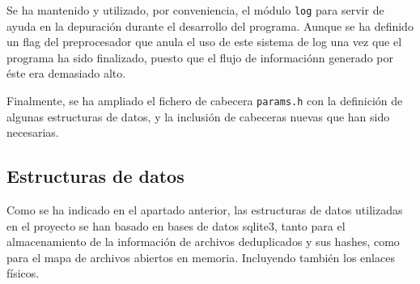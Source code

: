 \documentclass[12pt,a4paper]{article}
\begin{document}
Se ha mantenido y utilizado, por conveniencia, el módulo \texttt{\small log} para servir de ayuda en la depuración durante el desarrollo del programa. Aunque se ha definido un flag del preprocesador que anula el uso de este sistema de log una vez que el programa ha sido finalizado, puesto que el flujo de informaciónn generado por éste era demasiado alto.

Finalmente, se ha ampliado el fichero de cabecera \texttt{\small params.h} con la definición de algunas estructuras de datos, y la inclusión de cabeceras nuevas que han sido necesarias.

\subsection{Estructuras de datos}

Como se ha indicado en el apartado anterior, las estructuras de datos utilizadas en el proyecto se han basado en bases de datos sqlite3, tanto para el almacenamiento de la información de archivos deduplicados y sus hashes, como para el mapa de archivos abiertos en memoria. Incluyendo también los enlaces físicos.
\end{document}
